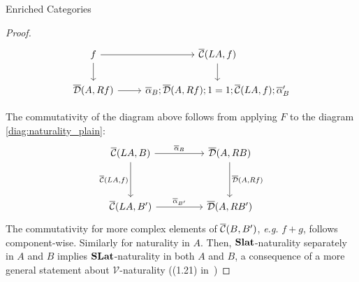 \documentclass[acmsmall, screen, nonacm]{acmart}
\begin{document}
\begin{section}{Enriched Categories}
\begin{proof}
\[
\begin{tikzcd}
	f & {\enriched{C}(LA,f)} \\
	{\enriched{D}(A,Rf)} & {\overline{\alpha}_{B};\enriched{D}(A,Rf);1 = 1;\enriched{C}(LA,f);\overline{\alpha}_{B}'}
	\arrow[from=1-1, to=1-2]
	\arrow[from=1-1, to=2-1]
	\arrow[from=1-2, to=2-2]
	\arrow[from=2-1, to=2-2]
\end{tikzcd}
\]

The commutativity of the diagram above follows from applying $F$ to the diagram \ref{diag:naturality_plain}:
\[\begin{tikzcd}
	{\enriched{C}(LA,B)} && {\enriched{D}(A,RB)} \\
	\\
	{\enriched{C}(LA,B')} && {\enriched{D}(A,RB')}
	\arrow["{\overline{\alpha}_{B}}", from=1-1, to=1-3]
	\arrow["{\enriched{C}(LA,f)}"', from=1-1, to=3-1]
	\arrow["{\enriched{D}(A,Rf)}", from=1-3, to=3-3]
	\arrow["{\overline{\alpha}_{B'}}", from=3-1, to=3-3]
\end{tikzcd}
\]
The commutativity for more complex elements of ${\overline{\mathcal{C}}}(B,B')$, \textit{e.g.} $f + g$, follows component-wise.
Similarly for naturality in $A$.
Then, $\mathbf{Slat}$-naturality separately in $A$ and $B$ implies $\mathbf{SLat}$-naturality in both $A$ and $B$, a consequence of a more general statement about $\mathcal{V}$-naturality ((1.21) in~\cite{Kelly2022BASICCO})

\end{proof}


\end{section}
\end{document}
